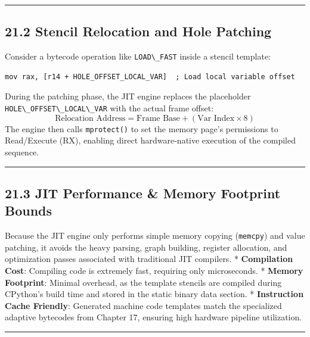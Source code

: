 \begin{center}\rule{0.5\linewidth}{0.5pt}\end{center}

\hypertarget{stencil-relocation-and-hole-patching}{%
\subsection{21.2 Stencil Relocation and Hole
Patching}\label{stencil-relocation-and-hole-patching}}

Consider a bytecode operation like \passthrough{\lstinline!LOAD\_FAST!}
inside a stencil template:

\begin{lstlisting}
mov rax, [r14 + HOLE_OFFSET_LOCAL_VAR]  ; Load local variable offset
\end{lstlisting}

During the patching phase, the JIT engine replaces the placeholder
\passthrough{\lstinline!HOLE\_OFFSET\_LOCAL\_VAR!} with the actual frame
offset:
\[\text{Relocation Address} = \text{Frame Base} + (\text{Var Index} \times 8)\]
The engine then calls \passthrough{\lstinline!mprotect()!} to set the
memory page's permissions to Read/Execute (RX), enabling direct
hardware-native execution of the compiled sequence.

\begin{center}\rule{0.5\linewidth}{0.5pt}\end{center}

\hypertarget{jit-performance-memory-footprint-bounds}{%
\subsection{21.3 JIT Performance \& Memory Footprint
Bounds}\label{jit-performance-memory-footprint-bounds}}

Because the JIT engine only performs simple memory copying
(\passthrough{\lstinline!memcpy!}) and value patching, it avoids the
heavy parsing, graph building, register allocation, and optimization
passes associated with traditional JIT compilers. * \textbf{Compilation
Cost}: Compiling code is extremely fast, requiring only microseconds. *
\textbf{Memory Footprint}: Minimal overhead, as the template stencils
are compiled during CPython's build time and stored in the static binary
data section. * \textbf{Instruction Cache Friendly}: Generated machine
code templates match the specialized adaptive bytecodes from Chapter 17,
ensuring high hardware pipeline utilization.

\begin{center}\rule{0.5\linewidth}{0.5pt}\end{center}
